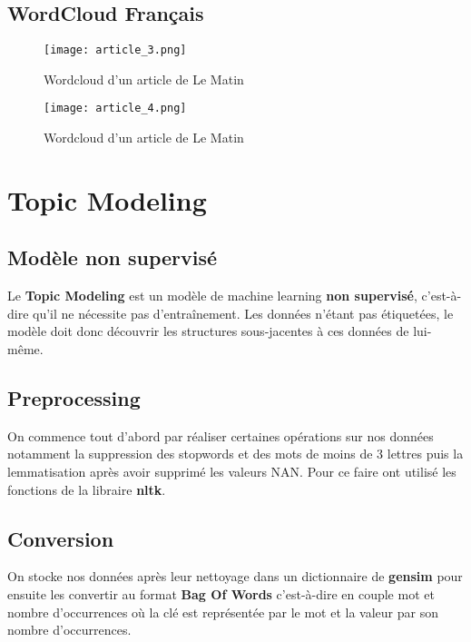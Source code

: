 \documentclass[a4paper,french,12pt]{article}
\begin{document}
\newpage

\subsection{WordCloud Français}

\vspace{20mm}

\begin{figure}[!h]
    \centering
    \texttt{[image: article\_3.png]}
    \caption{Wordcloud d'un article de Le Matin}
\end{figure}

\begin{figure}[!h]
    \centering
    \texttt{[image: article\_4.png]}
    \caption{Wordcloud d'un article de Le Matin}
\end{figure}

\newpage

\section{Topic Modeling}
\label{sec:Topic Modeling}

\subsection{Modèle non supervisé}

Le \textbf{Topic Modeling} est un modèle de machine learning \textbf{non supervisé}, c'est-à-dire qu'il ne nécessite pas d'entraînement. Les données n'étant pas étiquetées, le modèle doit donc découvrir les structures sous-jacentes à ces données de lui-même.

\subsection{Preprocessing}

On commence tout d'abord par réaliser certaines opérations sur nos données notamment la suppression des stopwords et des mots de moins de 3 lettres puis la lemmatisation après avoir supprimé les valeurs NAN. Pour ce faire ont utilisé les fonctions de la libraire \textbf{nltk}.

\subsection{Conversion}

On stocke nos données après leur nettoyage dans un dictionnaire de \textbf{gensim} pour ensuite les convertir au format \textbf{Bag Of Words} c'est-à-dire en couple mot et nombre d'occurrences où la clé est représentée par le mot et la valeur par son nombre d'occurrences.
\end{document}
